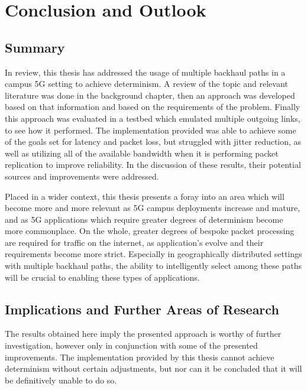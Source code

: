 
\cleardoublepage
\chapter{Conclusion and Outlook}
\label{cha:conclusion}

\section{Summary}

In review, this thesis has addressed the usage of multiple backhaul paths in a campus 5G setting to achieve determinism. A review of the topic and relevant literature was done in the background chapter, then an approach was developed based on that information and based on the requirements of the problem. Finally this approach was evaluated in a testbed which emulated multiple outgoing links, to see how it performed. The implementation provided was able to achieve some of the goals set for latency and packet loss, but struggled with jitter reduction, as well as utilizing all of the available bandwidth when it is performing packet replication to improve reliability. In the discussion of these results, their potential sources and improvements were addressed.

Placed in a wider context, this thesis presents a foray into an area which will become more and more relevant as 5G campus deployments increase and mature, and as 5G applications which require greater degrees of determinism become more commonplace. On the whole, greater degrees of bespoke packet processing are required for traffic on the internet, as application's evolve and their requirements become more strict. Especially in geographically distributed settings with multiple backhaul paths, the ability to intelligently select among these paths will be crucial to enabling these types of applications.


\section{Implications and Further Areas of Research}
\label{sec:implications}

The results obtained here imply the presented approach is worthy of further investigation, however only in conjunction with some of the presented improvements. The implementation provided by this thesis cannot achieve determinism without certain adjustments, but nor can it be concluded that it will be definitively unable to do so.

